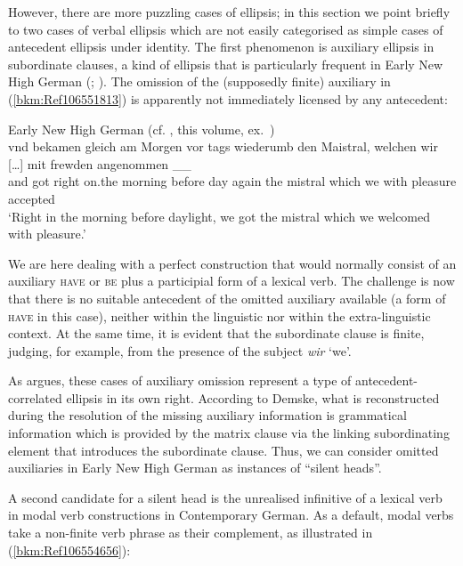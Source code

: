\documentclass[output=paper
  ,nobabel
  ,draftmode
  ,colorlinks, citecolor=brown
]{langscibook}
\begin{document}
However, there are more puzzling cases of ellipsis; in this section we point briefly to two cases of
verbal ellipsis which are not easily categorised as simple cases of antecedent ellipsis under
identity. The first phenomenon is auxiliary ellipsis in subordinate clauses, a kind of ellipsis that
is particularly frequent in Early New High German (\citealt{demske90};
\citealt{Breitbarth2005}). The omission of the (supposedly finite) auxiliary in
(\ref{bkm:Ref106551813}) is apparently not immediately licensed by any antecedent:



\ea
\label{bkm:Ref106551813}Early New High German (cf. \citealt{chapters/demske}, this volume, ex.\ )\\
\gll   vnd  bekamen gleich am     Morgen  vor    tags wiederumb den Maistral, welchen wir [\ldots] mit  frewden  angenommen  \_\_\\
       and  got     right  on.the morning before day  again     the mistral   which   we  {}       with pleasure accepted\\
\glt   `Right in the morning before daylight, we got the mistral which we welcomed with pleasure.'
\z

\noindent
We are here dealing with a perfect construction that would normally consist of an auxiliary
\textsc{have} or \textsc{be} plus a participial form of a lexical verb. The challenge is now that
there is no suitable antecedent of the omitted auxiliary available (a form of \textsc{have} in this
case), neither within the linguistic nor within the extra-linguistic context. At the same time, it
is evident that the subordinate clause is finite, judging, for example, from the presence of the
subject \emph{wir} `we'.

As \citet{chapters/demske} argues, these cases of auxiliary omission represent a type of
antecedent-correlated ellipsis in its own right. According to Demske, what is reconstructed during
the resolution of the missing auxiliary information is grammatical information which is provided by
the matrix clause via the linking subordinating element that introduces the subordinate
clause. Thus, we can consider omitted auxiliaries in Early New High German as instances of ``silent
heads''.

A second candidate for a silent head is the unrealised infinitive of a lexical verb in modal verb
constructions in Contemporary German. As a default, modal verbs take a non-finite verb phrase as
their complement, as illustrated in (\ref{bkm:Ref106554656}):
\end{document}
